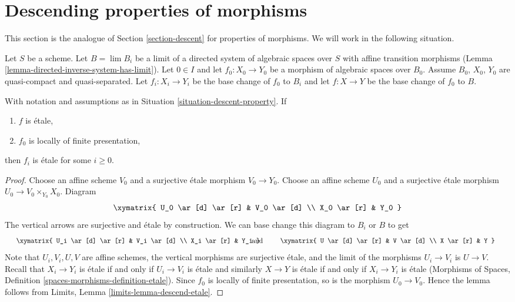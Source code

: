 \section{Descending properties of morphisms}
\label{section-descent-of-properties}

\noindent
This section is the analogue of Section \ref{section-descent}
for properties of morphisms. We will work in the following situation.

\begin{situation}
\label{situation-descent-property}
Let $S$ be a scheme. Let $B = \lim B_i$ be a limit of a directed system
of algebraic spaces over $S$ with affine transition morphisms
(Lemma \ref{lemma-directed-inverse-system-has-limit}).
Let $0 \in I$ and let $f_0 : X_0 \to Y_0$ be a morphism of algebraic spaces
over $B_0$. Assume $B_0$, $X_0$, $Y_0$ are quasi-compact and quasi-separated.
Let $f_i : X_i \to Y_i$ be the base change of $f_0$ to $B_i$ and
let $f : X \to Y$ be the base change of $f_0$ to $B$.
\end{situation}

\begin{lemma}
\label{lemma-descend-etale}
With notation and assumptions as in
Situation \ref{situation-descent-property}. If
\begin{enumerate}
\item $f$ is \'etale,
\item $f_0$ is locally of finite presentation,
\end{enumerate}
then $f_i$ is \'etale for some $i \geq 0$.
\end{lemma}

\begin{proof}
Choose an affine scheme $V_0$ and a surjective \'etale morphism
$V_0 \to Y_0$. Choose an affine scheme $U_0$ and a surjective \'etale
morphism $U_0 \to V_0 \times_{Y_0} X_0$. Diagram
$$
\xymatrix{
U_0 \ar[d] \ar[r] & V_0 \ar[d] \\
X_0 \ar[r] & Y_0
}
$$
The vertical arrows are surjective and \'etale by construction.
We can base change this diagram to $B_i$ or $B$ to get
$$
\vcenter{
\xymatrix{
U_i \ar[d] \ar[r] & V_i \ar[d] \\
X_i \ar[r] & Y_i
}
}
\quad\text{and}\quad
\vcenter{
\xymatrix{
U \ar[d] \ar[r] & V \ar[d] \\
X \ar[r] & Y
}
}
$$
Note that $U_i, V_i, U, V$ are affine schemes,
the vertical morphisms are surjective \'etale, and the limit of the
morphisms $U_i \to V_i$ is $U \to V$. Recall that $X_i \to Y_i$ is \'etale
if and only if $U_i \to V_i$ is
\'etale and similarly $X \to Y$ is \'etale if and only if
$X_i \to Y_i$ is \'etale
(Morphisms of Spaces, Definition \ref{spaces-morphisms-definition-etale}).
Since $f_0$ is locally of finite
presentation, so is the morphism $U_0 \to V_0$. Hence the lemma follows
from Limits, Lemma \ref{limits-lemma-descend-etale}.
\end{proof}

